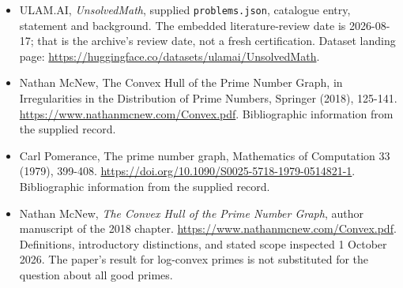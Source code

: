 \documentclass[11pt,a4paper]{article}
\begin{document}
{\small

\begin{itemize}

\item[\hypertarget{source:statement:1}{S1}] ULAM.AI, \emph{UnsolvedMath}, supplied \texttt{problems.json}, catalogue entry, statement and background. The embedded literature-review date is 2026-08-17; that is the archive’s review date, not a fresh certification. Dataset landing page: \url{https://huggingface.co/datasets/ulamai/UnsolvedMath}.

\item[\hypertarget{source:statement:2}{S2}] Nathan McNew, The Convex Hull of the Prime Number Graph, in Irregularities in the Distribution of Prime Numbers, Springer (2018), 125-141. \url{https://www.nathanmcnew.com/Convex.pdf}. Bibliographic information from the supplied record.

\item[\hypertarget{source:statement:3}{S3}] Carl Pomerance, The prime number graph, Mathematics of Computation 33 (1979), 399-408. \url{https://doi.org/10.1090/S0025-5718-1979-0514821-1}. Bibliographic information from the supplied record.


\item[E1] Nathan McNew, \emph{The Convex Hull of the Prime Number
Graph}, author manuscript of the 2018 chapter.
\url{https://www.nathanmcnew.com/Convex.pdf}.
Definitions, introductory distinctions, and stated scope inspected
1 October 2026. The paper's result for log-convex primes is not
substituted for the question about all good primes.

\end{itemize}

}

\label{end:statement}
\end{document}

